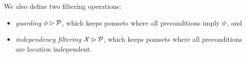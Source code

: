 We also define two filtering operations:
\begin{itemize}
\item \emph{guarding} $\phi\mathbin\rhd\mathcal{P}$, which
  keeps pomsets where all preconditions imply $\phi$, and
\item \emph{independency filtering} $\mathcal{X}\mathbin\rhd\mathcal{P}$, which keeps pomsets
  where all preconditions are location independent.
\end{itemize}






